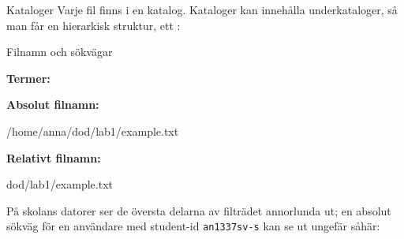\begin{Slide}{Kataloger}
    Varje fil finns i en katalog. Kataloger kan innehålla underkataloger, så man får en hierarkisk struktur, ett :
    \begin{center}
        \resizebox{!}{0.5\textwidth}{}
    \end{center}
\end{Slide}









\begin{Slide}{Filnamn och sökvägar}\SlideFontSmall

\textbf{Termer:}
\begin{itemize}
\end{itemize}

\blankline\noindent
\textbf{Absolut filnamn:}
\begin{Code}[language=]
/home/anna/dod/lab1/example.txt
\end{Code}

\noindent\textbf{Relativt filnamn:}
\begin{Code}[language=]
dod/lab1/example.txt
\end{Code}
{\SlideFontTiny
På skolans datorer ser de översta delarna av filträdet annorlunda ut; en absolut sökväg för en användare med student-id \texttt{an1337sv-s} kan se ut ungefär såhär: \\
}
\end{Slide}

